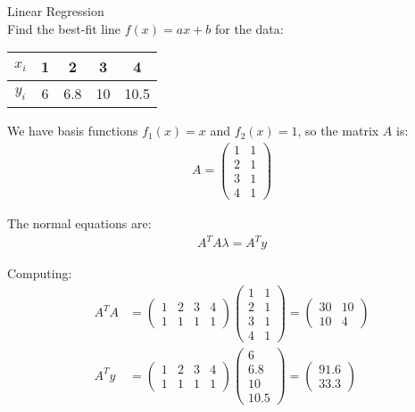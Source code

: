\begin{example2}{Linear Regression}\\
Find the best-fit line $f(x) = ax + b$ for the data:
\begin{center}
\begin{tabular}{c|cccc}
$x_i$ & 1 & 2 & 3 & 4 \\
\hline
$y_i$ & 6 & 6.8 & 10 & 10.5 \\
\end{tabular}
\end{center}

We have basis functions $f_1(x) = x$ and $f_2(x) = 1$, so the matrix $A$ is:
\begin{align*}
A = \begin{pmatrix}
1 & 1 \\
2 & 1 \\
3 & 1 \\
4 & 1
\end{pmatrix}
\end{align*}

The normal equations are:
\begin{align*}
A^T A\lambda = A^T y
\end{align*}

Computing:
\begin{align*}
A^T A &= \begin{pmatrix} 1 & 2 & 3 & 4 \\ 1 & 1 & 1 & 1 \end{pmatrix} \begin{pmatrix} 1 & 1 \\ 2 & 1 \\ 3 & 1 \\ 4 & 1 \end{pmatrix} = \begin{pmatrix} 30 & 10 \\ 10 & 4 \end{pmatrix}\\
A^T y &= \begin{pmatrix} 1 & 2 & 3 & 4 \\ 1 & 1 & 1 & 1 \end{pmatrix} \begin{pmatrix} 6 \\ 6.8 \\ 10 \\ 10.5 \end{pmatrix} = \begin{pmatrix} 91.6 \\ 33.3 \end{pmatrix}
\end{align*}


\end{example2}
